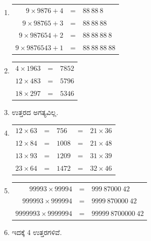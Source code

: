 \begin{enumerate}
\begin{figure}[H]
\end{figure}



\item 
\begin{tabular}[t]{r@{\;}c@{\;}l}
$9\times 9876 + 4$ & = & $88~88~8$\\
$9\times 98765 + 3$ & = & $88~88~88$\\
$9\times 987654 + 2$ & = & $88~88~88~8$\\
$9\times 9876543 + 1$ & = & $88~88~88~88$
\end{tabular}

\item 
\begin{tabular}[t]{l@{\;}l@{\;}l}
$4\times 1963$ & = & $7852$\\
$12\times 483$ & = & $5796$\\
$18\times 297$ & = & $5346$
\end{tabular}

\item ಉತ್ತರದ ಅಗತ್ಯವಿಲ್ಲ. 

\item 
\begin{tabular}[t]{l@{\;}l@{\;}l@{\;}l@{\;}l}
$12\times 63$ & = & $756$ & = & $21\times 36$\\
$12\times 84$ & = & $1008$ & = & $21\times 48$\\
$13\times 93$ & = & $1209$ & = & $31\times 39$\\
$23\times 64$ & = & $1472$ & = & $32\times 46$
\end{tabular}

\item 
\begin{tabular}[t]{r@{\;}c@{\;}l}
$99993\times 99994$ & = & $999~87000~42$\\
$999993\times 999994$ & = & $9999~870000~42$\\
$9999993\times 9999994$ & = & $99999~8700000~42$
\end{tabular}

\item ಇದಕ್ಕೆ 4 ಉತ್ತರಗಳಿವೆ. 


\end{enumerate}
